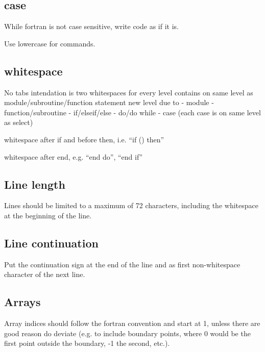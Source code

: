 \documentclass{article}
\begin{document}
\subsection{case}
While fortran is not case sensitive, write code as if it is.

Use lowercase for commands.

\subsection{whitespace}
No tabs
intendation is two whitespaces for every level
contains on same level as module/subroutine/function statement
new level due to
- module
- function/subroutine
- if/elseif/else
- do/do while
- case (each case is on same level as select)

whitespace after if and before then, i.e. ``if () then''

whitespace after end, e.g. ``end do'', ``end if''

\subsection{Line length}
Lines should be limited to a maximum of 72 characters, including the
whitespace at the beginning of the line.

\subsection{Line continuation}
Put the continuation sign at the end of the line and as first
non-whitespace character of the next line.

\subsection{Arrays}
Array indices should follow the fortran convention and start at 1,
unless there are good reason do deviate (e.g. to include boundary
points, where 0 would be the first point outside the boundary, -1 the
second, etc.).

\end{document}
